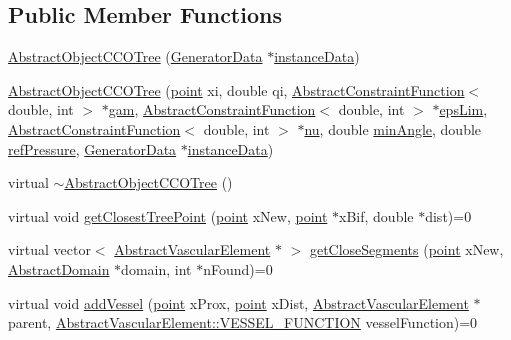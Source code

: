 \subsection*{Public Member Functions}
\begin{DoxyCompactItemize}
\item 
\hyperlink{class_abstract_object_c_c_o_tree_ac6be6b54f61f0db2dc79f47c4d1a1a3c}{Abstract\+Object\+C\+C\+O\+Tree} (\hyperlink{class_generator_data}{Generator\+Data} $\ast$\hyperlink{class_abstract_object_c_c_o_tree_aca7aecbd89dadc46dd9dce14cfde31e1}{instance\+Data})
\item 
\hyperlink{class_abstract_object_c_c_o_tree_a65b56c1f0f3cde3aebeca800b252afb6}{Abstract\+Object\+C\+C\+O\+Tree} (\hyperlink{structpoint}{point} xi, double qi, \hyperlink{class_abstract_constraint_function}{Abstract\+Constraint\+Function}$<$ double, int $>$ $\ast$\hyperlink{class_abstract_object_c_c_o_tree_aad315b93744637e18153c4434dac067d}{gam}, \hyperlink{class_abstract_constraint_function}{Abstract\+Constraint\+Function}$<$ double, int $>$ $\ast$\hyperlink{class_abstract_object_c_c_o_tree_a62d3e1ff7e74a6236422273f58fc6012}{eps\+Lim}, \hyperlink{class_abstract_constraint_function}{Abstract\+Constraint\+Function}$<$ double, int $>$ $\ast$\hyperlink{class_abstract_object_c_c_o_tree_a92e6b6d1a2fac7331eee34fb28158828}{nu}, double \hyperlink{class_abstract_object_c_c_o_tree_a254b7d92f417613be6019031a0afb63d}{min\+Angle}, double \hyperlink{class_abstract_object_c_c_o_tree_ae7215e6237e4d04625a0c96be9f3578d}{ref\+Pressure}, \hyperlink{class_generator_data}{Generator\+Data} $\ast$\hyperlink{class_abstract_object_c_c_o_tree_aca7aecbd89dadc46dd9dce14cfde31e1}{instance\+Data})
\item 
virtual \hyperlink{class_abstract_object_c_c_o_tree_a4d8361714194b0dec0dbda97bec68d2b}{$\sim$\+Abstract\+Object\+C\+C\+O\+Tree} ()
\item 
virtual void \hyperlink{class_abstract_object_c_c_o_tree_a24a38d8d43726a9b4d61efaa2f0bf33c}{get\+Closest\+Tree\+Point} (\hyperlink{structpoint}{point} x\+New, \hyperlink{structpoint}{point} $\ast$x\+Bif, double $\ast$dist)=0
\item 
virtual vector$<$ \hyperlink{class_abstract_vascular_element}{Abstract\+Vascular\+Element} $\ast$ $>$ \hyperlink{class_abstract_object_c_c_o_tree_a7b370f8d39164e1f391a7cc2eb607302}{get\+Close\+Segments} (\hyperlink{structpoint}{point} x\+New, \hyperlink{class_abstract_domain}{Abstract\+Domain} $\ast$domain, int $\ast$n\+Found)=0
\item 
virtual void \hyperlink{class_abstract_object_c_c_o_tree_a8fa23ca2ea8b9933ce80c331cede89eb}{add\+Vessel} (\hyperlink{structpoint}{point} x\+Prox, \hyperlink{structpoint}{point} x\+Dist, \hyperlink{class_abstract_vascular_element}{Abstract\+Vascular\+Element} $\ast$parent, \hyperlink{class_abstract_vascular_element_a7d7b7863aae4952ba79a590ee65702ec}{Abstract\+Vascular\+Element\+::\+V\+E\+S\+S\+E\+L\+\_\+\+F\+U\+N\+C\+T\+I\+ON} vessel\+Function)=0

\end{DoxyCompactItemize}
